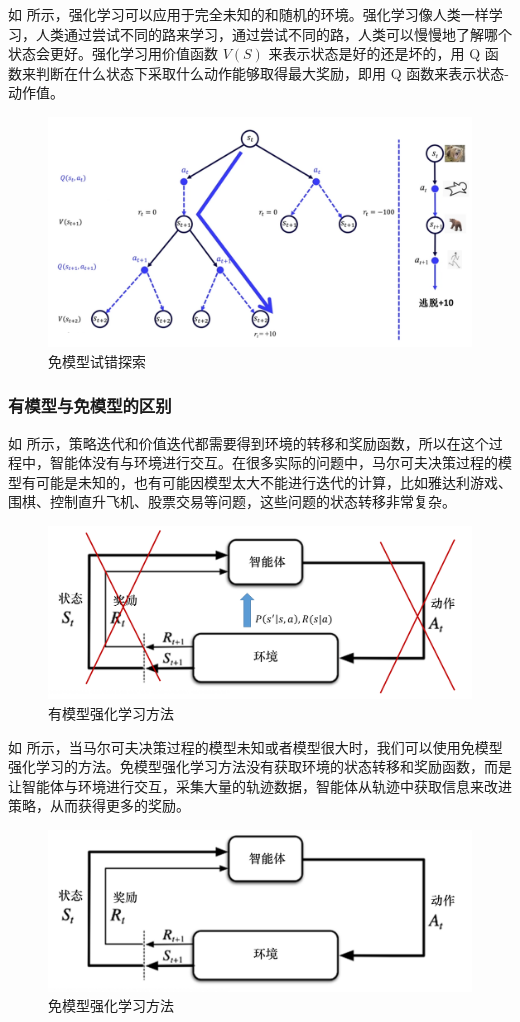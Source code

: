 如 所示，强化学习可以应用于完全未知的和随机的环境。强化学习像人类一样学习，人类通过尝试不同的路来学习，通过尝试不同的路，人类可以慢慢地了解哪个状态会更好。强化学习用价值函数 $V(S)$ 来表示状态是好的还是坏的，用 Q 函数来判断在什么状态下采取什么动作能够取得最大奖励，即用 Q 函数来表示状态-动作值。

\begin{figure}[htb]
	\centering
	\includegraphics[width=0.5\linewidth]{res/ch3/3.3}
	\caption{免模型试错探索}
	\label{fig:fig3.3}
\end{figure}

\subsubsection{有模型与免模型的区别} 

如 所示，策略迭代和价值迭代都需要得到环境的转移和奖励函数，所以在这个过程中，智能体没有与环境进行交互。在很多实际的问题中，马尔可夫决策过程的模型有可能是未知的，也有可能因模型太大不能进行迭代的计算，比如雅达利游戏、围棋、控制直升飞机、股票交易等问题，这些问题的状态转移非常复杂。

\begin{figure}[htb]
	\centering
	\includegraphics[width=0.5\linewidth]{res/ch3/model_free_1.png}
	\caption{有模型强化学习方法}
	\label{fig:model_free_1}
\end{figure}

如 所示，当马尔可夫决策过程的模型未知或者模型很大时，我们可以使用免模型强化学习的方法。免模型强化学习方法没有获取环境的状态转移和奖励函数，而是让智能体与环境进行交互，采集大量的轨迹数据，智能体从轨迹中获取信息来改进策略，从而获得更多的奖励。
\begin{figure}[htb]
	\centering
	\includegraphics[width=0.5\linewidth]{res/ch3/model_free_2}
	\caption{免模型强化学习方法}
	\label{fig:model_free_2}
\end{figure}


